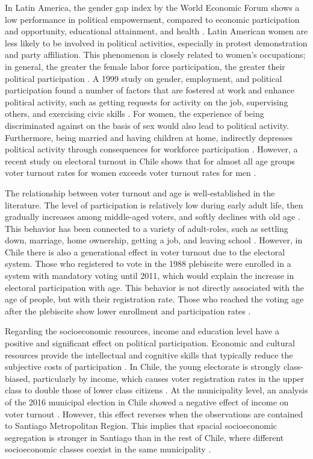 \documentclass[onecolumn]{article}
\begin{document}
In Latin America, the gender gap index by the World Economic Forum shows a low performance in political empowerment, compared to economic participation and opportunity, educational attainment, and health \cite{pachon2012}. Latin American women are less likely to be involved in political activities, especially in  protest demonstration and party affiliation. This phenomenon is closely related to women's occupations; in general, the greater the female labor force participation, the greater their political participation \cite{pachon2012}. A 1999 study on gender, employment, and political participation found a number of factors that are fostered at work and enhance political activity, such as getting requests for activity on the job, supervising others, and exercising civic skills \cite{schlozman1999}. For women, the experience of being discriminated against on the basis of sex would also lead to political activity. Furthermore, being married and having children at home, indirectly depresses political activity through consequences for workforce participation \cite{schlozman1999}. However, a recent study on electoral turnout in Chile shows that for almost all age groups voter turnout rates for women exceeds voter turnout rates for men \cite{pnud}.  


The relationship between voter turnout and age is well-established in the literature. The level of participation is relatively low during early adult life, then gradually increases among middle-aged voters, and softly declines with old age \cite{wolfinger1980}. This behavior has been connected to a variety of adult-roles, such as settling down, marriage, home ownership, getting a job, and leaving school \cite{highton2001}. However, in Chile  there is also a generational effect in voter turnout due to the electoral system. Those who registered to vote in the 1988 plebiscite were enrolled in a system with mandatory voting until 2011, which would explain the increase in electoral participation with age. This behavior is not directly associated with the age of people, but with their registration rate. Those who reached the voting age after the plebiscite show lower enrollment and participation rates \cite{contreras}. 



Regarding the socioeconomic resources, income and education level have a positive and significant effect on political participation. Economic and cultural resources provide the intellectual and cognitive skills that typically reduce the subjective costs of participation \cite{verba}. In Chile, the young electorate is strongly class-biased, particularly by income, which causes voter registration rates in the upper class to double those of lower class citizens \cite{corvalan}. At the municipality level, an analysis of the 2016 municipal election in Chile showed a negative effect of income on voter turnout \cite{pnud}. However, this effect reverses when the observations are contained to Santiago Metropolitan Region. This implies that spacial socioeconomic segregation is stronger in Santiago than in the rest of Chile, where different socioeconomic classes coexist in the same municipality \cite{pnud}. 
\end{document}
